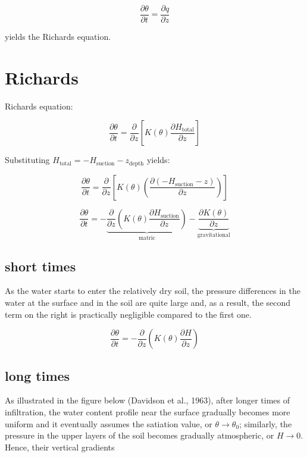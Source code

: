 \documentclass[
  letterpaper,
  DIV=11,
  numbers=noendperiod]{scrreprt}
\begin{document}
\[
\frac{\partial \theta}{\partial t} = \frac{\partial q}{\partial z}
\]

yields the Richards equation.

\hypertarget{richards}{%
\section{Richards}\label{richards}}

Richards equation:

\[
\frac{\partial \theta}{\partial t} = \frac{\partial}{\partial z}
\left[
K(\theta)
\frac{\partial H_\text{total}}{\partial z}
\right]
\]

Substituting \(H_\text{total}=-H_\text{suction}-z_\text{depth}\) yields:

\[
\frac{\partial \theta}{\partial t} = \frac{\partial}{\partial z}
\left[
K(\theta)
\left(
\frac{\partial(-H_\text{suction} - z)}{\partial z}
\right)
\right]
\]

\[
\frac{\partial \theta}{\partial t} =
-
\underbrace{
\frac{\partial}{\partial z}
\left(
K(\theta)
\frac{\partial H_\text{suction}}{\partial z}
\right)
}
_{\text{matric}}
-
\underbrace{
\frac{\partial K(\theta)}{\partial z}
}
_{\text{gravitational}}
\]

\hypertarget{short-times}{%
\subsection{short times}\label{short-times}}

As the water starts to enter the relatively dry soil, the pressure
differences in the water at the surface and in the soil are quite large
and, as a result, the second term on the right is practically negligible
compared to the first one.

\[
\frac{\partial \theta}{\partial t} =
-
\frac{\partial}{\partial z}
\left(
K(\theta)
\frac{\partial H}{\partial z}
\right)
\]

\hypertarget{long-times}{%
\subsection{long times}\label{long-times}}

As illustrated in the figure below (Davidson et al., 1963), after longer
times of infiltration, the water content profile near the surface
gradually becomes more uniform and it eventually assumes the satiation
value, or \(\theta\rightarrow \theta_0\); similarly, the pressure in the
upper layers of the soil becomes gradually atmospheric, or
\(H \rightarrow 0\). Hence, their vertical gradients
\end{document}
